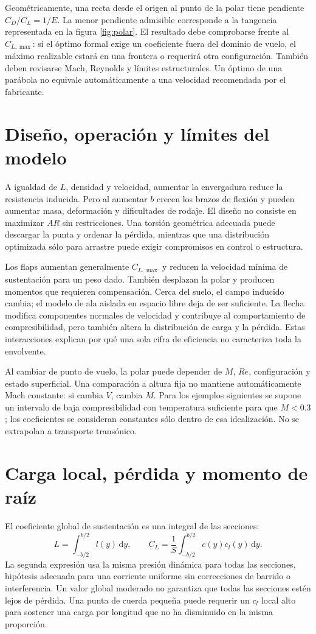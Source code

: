 Geométricamente, una recta desde el origen al punto de la polar tiene pendiente $C_D/C_L=1/E$. La menor pendiente admisible corresponde a la tangencia representada en la figura \ref{fig:polar}. El resultado debe comprobarse frente al $C_{L,\max}$: si el óptimo formal exige un coeficiente fuera del dominio de vuelo, el máximo realizable estará en una frontera o requerirá otra configuración. También deben revisarse Mach, Reynolds y límites estructurales. Un óptimo de una parábola no equivale automáticamente a una velocidad recomendada por el fabricante.

\section{Diseño, operación y límites del modelo}
A igualdad de $L$, densidad y velocidad, aumentar la envergadura reduce la resistencia inducida. Pero al aumentar $b$ crecen los brazos de flexión y pueden aumentar masa, deformación y dificultades de rodaje. El diseño no consiste en maximizar $AR$ sin restricciones. Una torsión geométrica adecuada puede descargar la punta y ordenar la pérdida, mientras que una distribución optimizada sólo para arrastre puede exigir compromisos en control o estructura.

Los flaps aumentan generalmente $C_{L,\max}$ y reducen la velocidad mínima de sustentación para un peso dado. También desplazan la polar y producen momentos que requieren compensación. Cerca del suelo, el campo inducido cambia; el modelo de ala aislada en espacio libre deja de ser suficiente. La flecha modifica componentes normales de velocidad y contribuye al comportamiento de compresibilidad, pero también altera la distribución de carga y la pérdida. Estas interacciones explican por qué una sola cifra de eficiencia no caracteriza toda la envolvente.

Al cambiar de punto de vuelo, la polar puede depender de $M$, $Re$, configuración y estado superficial. Una comparación a altura fija no mantiene automáticamente Mach constante: si cambia $V$, cambia $M$. Para los ejemplos siguientes se supone un intervalo de baja compresibilidad con temperatura suficiente para que $M<0.3$; los coeficientes se consideran constantes sólo dentro de esa idealización. No se extrapolan a transporte transónico.

\section{Carga local, pérdida y momento de raíz}
El coeficiente global de sustentación es una integral de las secciones:
\begin{equation}
L=\int_{-b/2}^{b/2}l(y)\,\mathrm dy,
\qquad C_L=\frac1S\int_{-b/2}^{b/2}c(y)c_l(y)\,\mathrm dy.
\end{equation}
La segunda expresión usa la misma presión dinámica para todas las secciones, hipótesis adecuada para una corriente uniforme sin correcciones de barrido o interferencia. Un valor global moderado no garantiza que todas las secciones estén lejos de pérdida. Una punta de cuerda pequeña puede requerir un $c_l$ local alto para sostener una carga por longitud que no ha disminuido en la misma proporción.

